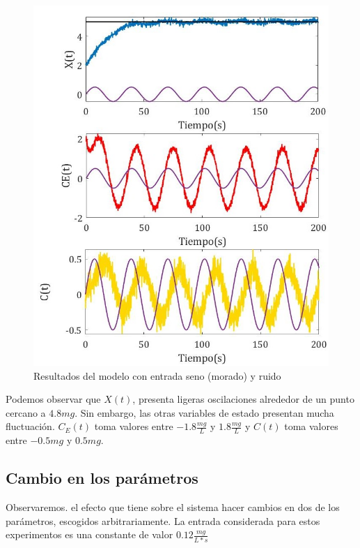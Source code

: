 \begin{enumerate}
\begin{figure}[ht]
\centering
\includegraphics[scale = 0.4]{entrada-seno}
\caption{Resultados del modelo con entrada seno (morado) y ruido}
\label{fig:entrada-seno}
\end{figure}

Podemos observar que $X(t)$, presenta ligeras oscilaciones alrededor de un punto cercano a $4.8mg$. Sin embargo, las otras variables de estado presentan mucha fluctuación. $C_E(t)$ toma valores entre $-1.8\frac{mg}{L}$ y $1.8\frac{mg}{L}$ y $C(t)$ toma valores entre $-0.5mg$ y $0.5mg$.
\end{enumerate}


\subsection{Cambio en los parámetros}
\label{sec:parameters}
Observaremos. el efecto que tiene sobre el sistema hacer cambios en dos de los parámetros, escogidos arbitrariamente. La entrada considerada para estos experimentos es una constante de valor $0.12\frac{mg}{L*s}$\\

